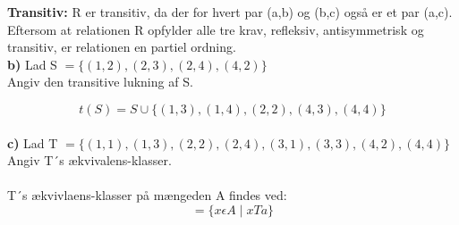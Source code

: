 \documentclass{article}
\begin{document}
\textbf{Transitiv:} R er transitiv, da der for hvert par (a,b) og (b,c) også er et par (a,c). \\

Eftersom at relationen R opfylder alle tre krav, refleksiv, antisymmetrisk og transitiv, er relationen en partiel ordning. \\

\textbf{b)} Lad S \(=\lbrace(1,2), (2,3), (2,4), (4,2)\rbrace\)
\\Angiv den transitive lukning af S.

\begin{displaymath}
t(S) = S \cup \lbrace(1,3), (1,4), (2,2), (4,3), (4,4)\rbrace
\end{displaymath}
\\
\textbf{c)} Lad T \(=\lbrace(1,1), (1,3), (2,2), (2,4), (3,1), (3,3), (4,2), (4,4)\rbrace\)
\\Angiv T´s ækvivalens-klasser.\\
\\
T´s ækvivlaens-klasser på mængeden A findes ved:
\begin{displaymath}
[ a ] = \lbrace x \epsilon A \mid xTa \rbrace
\end{displaymath}
\end{document}
